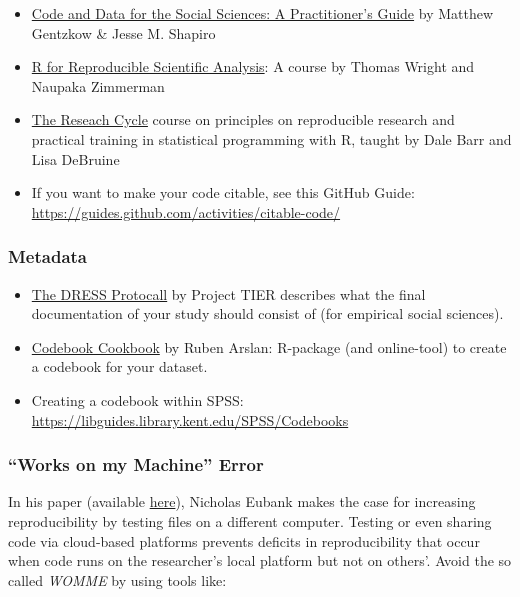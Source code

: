 \documentclass[12pt,]{report}
\providecommand{\tightlist}{%
  \setlength{\itemsep}{0pt}\setlength{\parskip}{0pt}}
\begin{document}
\begin{itemize}
\tightlist
\item
  \href{http://home.bi.no/charlotte.ostergaard/students/CodeAndData.pdf}{Code
  and Data for the Social Sciences: A Practitioner's Guide} by Matthew
  Gentzkow \& Jesse M. Shapiro
\item
  \href{http://swcarpentry.github.io/r-novice-gapminder/}{R for
  Reproducible Scientific Analysis}: A course by Thomas Wright and
  Naupaka Zimmerman
\item
  \href{https://gupsych.github.io/research_cycle/}{The Reseach Cycle}
  course on principles on reproducible research and practical training
  in statistical programming with R, taught by Dale Barr and Lisa
  DeBruine
\item
  If you want to make your code citable, see this GitHub Guide:
  \url{https://guides.github.com/activities/citable-code/}
\end{itemize}

\subsubsection{Metadata}\label{metadata}

\begin{itemize}
\tightlist
\item
  \href{https://www.projecttier.org/tier-protocol/dress-protocol/}{The
  DRESS Protocall} by Project TIER describes what the final
  documentation of your study should consist of (for empirical social
  sciences).
\item
  \href{https://rubenarslan.github.io/codebook/}{Codebook Cookbook} by
  Ruben Arslan: R-package (and online-tool) to create a codebook for
  your dataset.
\item
  Creating a codebook within SPSS:
  \url{https://libguides.library.kent.edu/SPSS/Codebooks}
\end{itemize}

\subsubsection{\texorpdfstring{``Works on my Machine''
Error}{Works on my Machine Error}}\label{works-on-my-machine-error}

In his paper (available
\href{https://doi.org/10.1017/S1049096516000196}{here}), Nicholas Eubank
makes the case for increasing reproducibility by testing files on a
different computer. Testing or even sharing code via cloud-based
platforms prevents deficits in reproducibility that occur when code runs
on the researcher's local platform but not on others'. Avoid the so
called \emph{WOMME} by using tools like:
\end{document}
